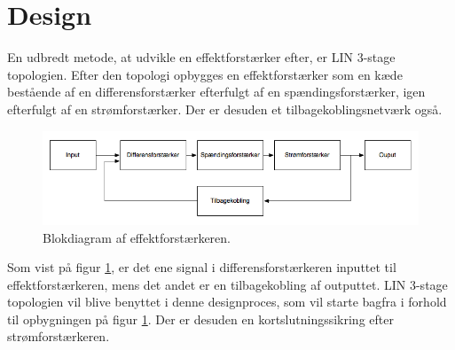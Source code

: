 \section{Design}
En udbredt metode, at udvikle en effektforstærker efter, er LIN 3-stage topologien. Efter den topologi opbygges en effektforstærker som en kæde bestående af en differensforstærker efterfulgt af en spændingsforstærker, igen efterfulgt af en strømforstærker. Der er desuden et tilbagekoblingsnetværk også. 

\begin{figure}[h]
\centering
\includegraphics[scale=0.5]{teknisk/effektforstaerker/blokdiagram-effektforstaerker.png}
\caption{Blokdiagram af effektforstærkeren.}
\label{fig:lin_effektforstaerker}
\end{figure}

Som vist på figur \ref{fig:lin_effektforstaerker}, er det ene signal i differensforstærkeren inputtet til effektforstærkeren, mens det andet er en tilbagekobling af outputtet. LIN 3-stage topologien vil blive benyttet i denne designproces, som vil starte bagfra i forhold til opbygningen på figur \ref{fig:lin_effektforstaerker}. Der er desuden en kortslutningssikring efter strømforstærkeren.
